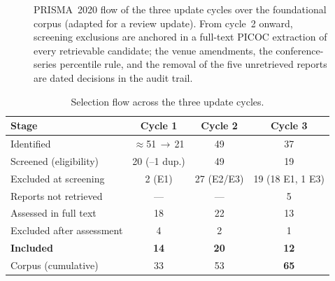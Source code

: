 \documentclass{ieeeaccess}
\begin{document}
\begin{figure}[!t]
{%
}
\caption{PRISMA~2020 flow of the three update cycles over the
foundational corpus (adapted for a review update). From cycle~2 onward,
screening exclusions are anchored in a full-text PICOC extraction of
every retrievable candidate; the venue amendments, the
conference-series percentile rule, and the removal of the five unretrieved
reports are dated decisions in the audit trail.}
\label{fig:prisma}
\end{figure}

\begin{table}[!t]
\caption{Selection flow across the three update cycles.}
\label{tab:prisma}
\centering
\footnotesize
\setlength{\tabcolsep}{3.5pt}%
\begin{tabular}{@{}lccc@{}}
\toprule
\textbf{Stage} & \textbf{Cycle 1} & \textbf{Cycle 2} & \textbf{Cycle 3} \\
\midrule
Identified                 & $\approx$51$\,\rightarrow\,$21 & 49 & 37 \\
Screened (eligibility)     & 20 (--1 dup.)  & 49 & 19 \\
Excluded at screening      & 2 (E1)         & 27 (E2/E3) & 19 (18 E1, 1 E3) \\
Reports not retrieved      & ---            & --- & 5 \\
Assessed in full text      & 18             & 22 & 13 \\
Excluded after assessment  & 4              & 2  & 1 \\
\textbf{Included}          & \textbf{14}    & \textbf{20} & \textbf{12} \\
Corpus (cumulative)        & 33             & 53 & \textbf{65} \\
\bottomrule
\end{tabular}
\end{table}
\end{document}
